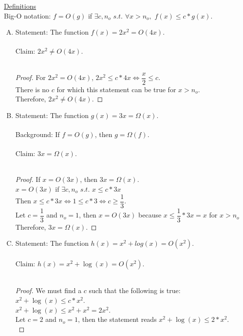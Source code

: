 \documentclass{article}
\begin{document}
\clearpage
\header

\underline{Definitions} \\
Big-O notation: $f=O(g)$ if $\exists c,n_o$ $s.t.$ $\forall x>n_o,$ $f(x) \leq c*g(x)$.

\begin{enumerate}[(A)]
	\item Statement: The function $f(x)=2x^2=O(4x)$. \\\\
		Claim: $2x^2 \neq O(4x)$. \\\\
		\begin{proof}
			For $2x^2=O(4x)$, $2x^2 \leq c*4x \iff \dfrac{x}{2} \leq c$. \\
			There is no $c$ for which this statement can be true for $x>n_o$. \\
			Therefore, $2x^2 \neq O(4x)$.
		\end{proof}
	\item Statement: The function $g(x)=3x=\Omega (x)$. \\\\
		Background: If $f=O(g)$, then $g=\Omega (f)$. \\\\
		Claim: $3x=\Omega (x)$. \\\\
		\begin{proof}
			If $x=O(3x)$, then $3x=\Omega (x)$. \\
			$x=O(3x)$ if $\exists c,n_o$ $s.t.$ $x \leq c*3x$ \\
			Then $x \leq c*3x \iff 1 \leq c*3 \iff c \geq \dfrac{1}{3}$. \\
			Let $c=\dfrac{1}{3}$ and $n_o = 1$, then $x=O(3x)$ because $x \leq \dfrac{1}{3} *3x=x$ for $x>n_o$\\
			Therefore, $3x=\Omega (x)$.
		\end{proof}
	\item Statement: The function $h(x)=x^2 + log(x)=O(x^2)$. \\\\
		Claim: $h(x)=x^2 + \log(x)=O(x^2)$. \\\\
		\begin{proof}
			We must find a $c$ such that the following is true: $x^2 + \log(x) \leq c*x^2$. \\
			$x^2 + \log(x) \leq x^2 + x^2 = 2x^2$. \\
			Let $c=2$ and $n_o=1$, then the statement reads $x^2 + \log(x) \leq 2*x^2$. \\

\end{proof}
\end{enumerate}
\end{document}
